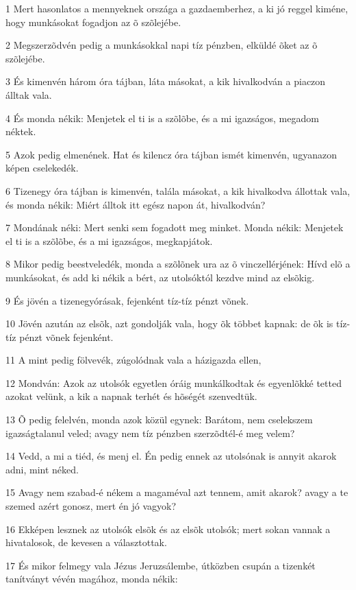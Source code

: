 \par 1 Mert hasonlatos a mennyeknek országa a gazdaemberhez, a ki jó reggel kiméne, hogy munkásokat fogadjon az õ szõlejébe.
\par 2 Megszerzõdvén pedig a munkásokkal napi tíz pénzben, elküldé õket az õ szõlejébe.
\par 3 És kimenvén három óra tájban, láta másokat, a kik hivalkodván a piaczon álltak vala.
\par 4 És monda nékik: Menjetek el ti is a szõlõbe, és a mi igazságos, megadom néktek.
\par 5 Azok pedig elmenének. Hat és kilencz óra tájban ismét kimenvén, ugyanazon képen cselekedék.
\par 6 Tizenegy óra tájban is kimenvén, talála másokat, a kik hivalkodva állottak vala, és monda nékik: Miért álltok itt egész napon át, hivalkodván?
\par 7 Mondának néki: Mert senki sem fogadott meg minket. Monda nékik: Menjetek el ti is a szõlõbe, és a mi igazságos, megkapjátok.
\par 8 Mikor pedig beestveledék, monda a szõlõnek ura az õ vinczellérjének: Hívd elõ a munkásokat, és add ki nékik a bért, az utolsóktól kezdve mind az elsõkig.
\par 9 És jövén a tizenegyórásak, fejenként tíz-tíz pénzt võnek.
\par 10 Jövén azután az elsõk, azt gondolják vala, hogy õk többet kapnak: de õk is tíz-tíz pénzt võnek fejenként.
\par 11 A mint pedig fölvevék, zúgolódnak vala a házigazda ellen,
\par 12 Mondván: Azok az utolsók egyetlen óráig munkálkodtak és egyenlõkké tetted azokat velünk, a kik a napnak terhét és hõségét szenvedtük.
\par 13 Õ pedig felelvén, monda azok közül egynek: Barátom, nem cselekszem igazságtalanul veled; avagy nem tíz pénzben szerzõdtél-é meg velem?
\par 14 Vedd, a mi a tiéd, és menj el. Én pedig ennek az utolsónak is annyit akarok adni, mint néked.
\par 15 Avagy nem szabad-é nékem a magaméval azt tennem, amit akarok? avagy a te szemed azért gonosz, mert én jó vagyok?
\par 16 Ekképen lesznek az utolsók elsõk és az elsõk utolsók; mert sokan vannak a hivatalosok,  de kevesen a választottak.
\par 17 És mikor felmegy vala Jézus Jeruzsálembe, útközben csupán a tizenkét tanítványt vévén magához, monda nékik:
